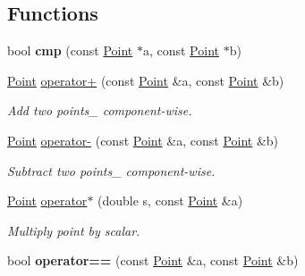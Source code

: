 \subsection*{Functions}
\begin{DoxyCompactItemize}
\item 
\mbox{\label{namespacep2t_ab82db1108f5abd29df4537180f6e639c}} 
bool {\bfseries cmp} (const \hyperlink{structp2t_1_1Point}{Point} $\ast$a, const \hyperlink{structp2t_1_1Point}{Point} $\ast$b)
\item 
\mbox{\label{namespacep2t_a98db07c78d588aa4e68ffdaadd503d45}} 
\hyperlink{structp2t_1_1Point}{Point} \hyperlink{namespacep2t_a98db07c78d588aa4e68ffdaadd503d45}{operator+} (const \hyperlink{structp2t_1_1Point}{Point} \&a, const \hyperlink{structp2t_1_1Point}{Point} \&b)
\begin{DoxyCompactList}\small\item\em Add two points\+\_\+ component-\/wise. \end{DoxyCompactList}\item 
\mbox{\label{namespacep2t_adebd7f2104fff7945192e249aaeed77f}} 
\hyperlink{structp2t_1_1Point}{Point} \hyperlink{namespacep2t_adebd7f2104fff7945192e249aaeed77f}{operator-\/} (const \hyperlink{structp2t_1_1Point}{Point} \&a, const \hyperlink{structp2t_1_1Point}{Point} \&b)
\begin{DoxyCompactList}\small\item\em Subtract two points\+\_\+ component-\/wise. \end{DoxyCompactList}\item 
\mbox{\label{namespacep2t_a4f005ffa2a5d03029a3619fb8110c4a9}} 
\hyperlink{structp2t_1_1Point}{Point} \hyperlink{namespacep2t_a4f005ffa2a5d03029a3619fb8110c4a9}{operator$\ast$} (double s, const \hyperlink{structp2t_1_1Point}{Point} \&a)
\begin{DoxyCompactList}\small\item\em Multiply point by scalar. \end{DoxyCompactList}\item 
\mbox{\label{namespacep2t_ac84d990aed3d2218987d6846a8249fb8}} 
bool {\bfseries operator==} (const \hyperlink{structp2t_1_1Point}{Point} \&a, const \hyperlink{structp2t_1_1Point}{Point} \&b)
\item 

\end{DoxyCompactItemize}
